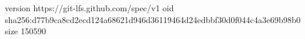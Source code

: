 version https://git-lfs.github.com/spec/v1
oid sha256:d77b9ca8cd2ecd124a68621d946d36119464d24edbbf30d0f044c4a3e69b98b0
size 150590
